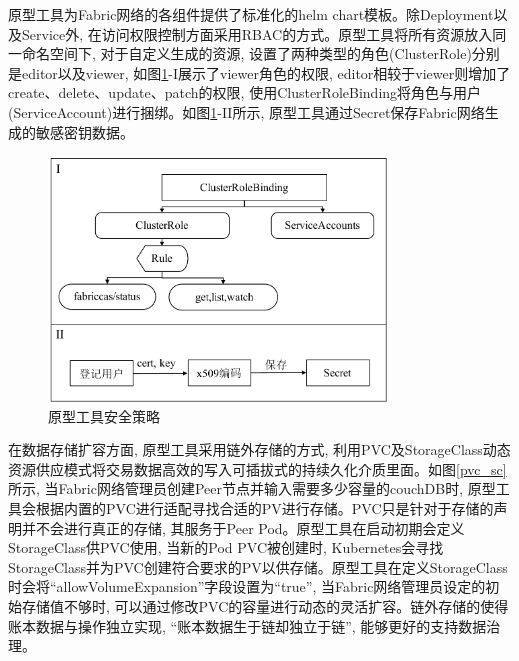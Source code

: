 原型工具为Fabric网络的各组件提供了标准化的helm chart模板。除Deployment以及Service外, 在访问权限控制方面采用RBAC的方式。原型工具将所有资源放入同一命名空间下, 对于自定义生成的资源, 设置了两种类型的角色(ClusterRole)分别是editor以及viewer, 如图\ref{safety}-I展示了viewer角色的权限, editor相较于viewer则增加了create、delete、update、patch的权限, 使用ClusterRoleBinding将角色与用户(ServiceAccount)进行捆绑。如图\ref{safety}-II所示, 原型工具通过Secret保存Fabric网络生成的敏感密钥数据。

\begin{figure}[h] %
    \centering %
    \includegraphics[width=0.8\textwidth]{FIGs/chapter4/safety.pdf} %
    \caption{原型工具安全策略} %
    \label{safety} %
\end{figure}%

在数据存储扩容方面, 原型工具采用链外存储的方式, 利用PVC及StorageClass动态资源供应模式将交易数据高效的写入可插拔式的持续久化介质里面。如图\ref{pvc_sc}所示, 当Fabric网络管理员创建Peer节点并输入需要多少容量的couchDB时, 原型工具会根据内置的PVC进行适配寻找合适的PV进行存储。PVC只是针对于存储的声明并不会进行真正的存储, 其服务于Peer Pod。原型工具在启动初期会定义StorageClass供PVC使用, 当新的Pod PVC被创建时, Kubernetes会寻找StorageClass并为PVC创建符合要求的PV以供存储。原型工具在定义StorageClass时会将“allowVolumeExpansion”字段设置为“true”, 当Fabric网络管理员设定的初始存储值不够时, 可以通过修改PVC的容量进行动态的灵活扩容。链外存储的使得账本数据与操作独立实现, “账本数据生于链却独立于链”, 能够更好的支持数据治理。

